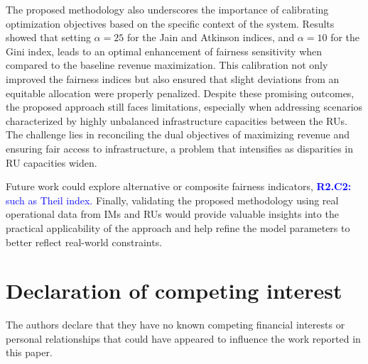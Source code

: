 \documentclass[preprint,12pt]{elsarticle}
\begin{document}
The proposed methodology also underscores the importance of calibrating optimization objectives based on the specific context of the system. Results showed that setting $\alpha=25$ for the Jain and Atkinson indices, and $\alpha=10$ for the Gini index, leads to an optimal enhancement of fairness sensitivity when compared to the baseline revenue maximization. This calibration not only improved the fairness indices but also ensured that slight deviations from an equitable allocation were properly penalized. Despite these promising outcomes, the proposed approach still faces limitations, especially when addressing scenarios characterized by highly unbalanced infrastructure capacities between the \glspl{RU}. The challenge lies in reconciling the dual objectives of maximizing revenue and ensuring fair access to infrastructure, a problem that intensifies as disparities in RU capacities widen.

Future work could explore alternative or composite fairness indicators, \textcolor{blue}{\textbf{R2.C2:} such as Theil index.} Finally, validating the proposed methodology using real operational data from \glspl{IM} and \glspl{RU} would provide valuable insights into the practical applicability of the approach and help refine the model parameters to better reflect real-world constraints.



\section*{Declaration of competing interest}
The authors declare that they have no known competing financial interests or personal relationships that could have appeared to influence the work reported in this paper.
\end{document}
